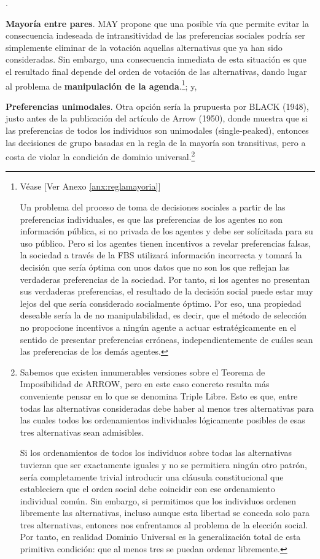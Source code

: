 \documentclass[10pt,a4paper]{article}
\newcounter{numitem}
\newenvironment{lnum}
      {\begin{list}{\arabic{numitem}.}{%
          \usecounter{numitem}%
          \setlength{\leftmargin}{1cm}%
          \setlength{\parskip}{3pt}%
          \setlength{\itemsep}{0pt}%
          \setlength{\parsep}{0pt}%
      }}
      {\end{list}}
\newcommand{\authorfont}[1]{{\fontfamily{EBGaramond-TLF}\selectfont #1}}
\begin{document}
\begin{lnum}
    \item \textbf{Mayoría entre pares}. MAY propone que una posible vía que permite evitar la consecuencia indeseada de intransitividad de las preferencias sociales podría ser simplemente eliminar de la votación aquellas alternativas que ya han sido consideradas. Sin embargo, una consecuencia inmediata de esta situación es que el resultado final depende del orden de votación de las alternativas, dando lugar al problema de \textbf{manipulación de la agenda}.\footnote{%
        Véase [\authorfont{Ver Anexo \ref{anx:reglamayoria}}]
    
    Un problema del proceso de toma de decisiones sociales a partir de las preferencias individuales, es que las preferencias de los agentes no son información pública, si no privada de los agentes y debe ser solícitada para su uso público. Pero si los agentes tienen incentivos a revelar preferencias falsas, la sociedad a través de la FBS utilizará información incorrecta y tomará la decisión que sería óptima con unos datos que no son los que reflejan las verdaderas preferencias de la sociedad. Por tanto, si los agentes no presentan sus verdaderas preferencias, el resultado de la decisión social puede estar muy lejos del que sería considerado socialmente óptimo. Por eso, una propiedad deseable sería la de no manipulabilidad, es decir, que el método de selección no propocione incentivos a ningún agente a actuar estratégicamente en el sentido de presentar preferencias erróneas, independientemente de cuáles sean las preferencias de los demás agentes.
    }; y,
    \item \textbf{Preferencias unimodales}. Otra opción sería la prupuesta por BLACK (1948), justo antes de la publicación del artículo de Arrow (1950), donde muestra que si las preferencias de todos los individuos son unimodales (single-peaked), entonces las decisiones de grupo basadas en la regla de la mayoría son transitivas, pero a costa de violar la condición de dominio universal.\footnote{
    Sabemos que existen innumerables versiones sobre el Teorema de Imposibilidad de ARROW, pero en este caso concreto resulta más conveniente pensar en lo que se denomina Triple Libre. Esto es que, entre todas las alternativas consideradas debe haber al menos tres alternativas para las cuales todos los ordenamientos individuales lógicamente posibles de esas tres alternativas sean admisibles.
    
    Si los ordenamientos de todos los individuos sobre todas las alternativas tuvieran que ser exactamente iguales y no se permitiera ningún otro patrón, sería completamente trivial introducir una cláusula constitucional que estableciera que el orden social debe coincidir con ese ordenamiento individual común. Sin embargo, si permitimos que los individuos ordenen libremente las alternativas, incluso aunque esta libertad se conceda solo para tres alternativas, entonces nos enfrentamos al problema de la elección social. Por tanto, en realidad Dominio Universal es la generalización total de esta primitiva condición: que al menos tres se puedan ordenar libremente.

}
\end{lnum}
\end{document}
